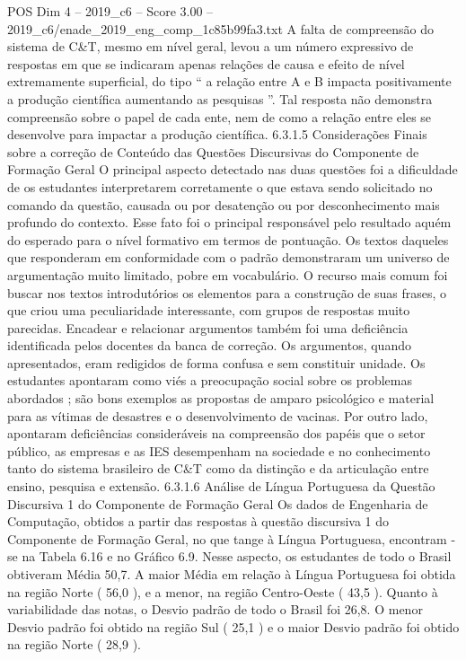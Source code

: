 \begin{textsample}{POS Dim 4 – 2019\_c6 – Score 3.00 – 2019\_c6/enade\_2019\_eng\_comp\_1c85b99fa3.txt}
A falta de compreensão do sistema de C\&T, mesmo em nível geral, levou a um número expressivo de respostas em que se indicaram apenas relações de causa e efeito de nível extremamente superficial, do tipo “ a relação entre A e B impacta positivamente a produção científica aumentando as pesquisas ”.
Tal resposta não demonstra compreensão sobre o papel de cada ente, nem de como a relação entre eles se desenvolve para impactar a produção científica. 6.3.1.5 Considerações Finais sobre a correção de Conteúdo das Questões Discursivas do Componente de Formação Geral O principal aspecto detectado nas duas questões foi a dificuldade de os estudantes interpretarem corretamente o que estava sendo solicitado no comando da questão, causada ou por desatenção ou por desconhecimento mais profundo do contexto.
Esse fato foi o principal responsável pelo resultado aquém do esperado para o nível formativo em termos de pontuação.
Os textos daqueles que responderam em conformidade com o padrão demonstraram um universo de argumentação muito limitado, pobre em vocabulário.
O recurso mais comum foi buscar nos textos introdutórios os elementos para a construção de suas frases, o que criou uma peculiaridade interessante, com grupos de respostas muito parecidas.
Encadear e relacionar argumentos também foi uma deficiência identificada pelos docentes da banca de correção.
Os argumentos, quando apresentados, eram redigidos de forma confusa e sem constituir unidade.
Os estudantes apontaram como viés a preocupação social sobre os problemas abordados ; são bons exemplos as propostas de amparo psicológico e material para as vítimas de desastres e o desenvolvimento de vacinas.
Por outro lado, apontaram deficiências consideráveis na compreensão dos papéis que o setor público, as empresas e as IES desempenham na sociedade e no conhecimento tanto do sistema brasileiro de C\&T como da distinção e da articulação entre ensino, pesquisa e extensão. 6.3.1.6 Análise de Língua Portuguesa da Questão Discursiva 1 do Componente de Formação Geral Os dados de Engenharia de Computação, obtidos a partir das respostas à questão discursiva 1 do Componente de Formação Geral, no que tange à Língua Portuguesa, encontram -se na Tabela 6.16 e no Gráfico 6.9.
Nesse aspecto, os estudantes de todo o Brasil obtiveram Média 50,7.
A maior Média em relação à Língua Portuguesa foi obtida na região Norte ( 56,0 ), e a menor, na região Centro-Oeste ( 43,5 ).
Quanto à variabilidade das notas, o Desvio padrão de todo o Brasil foi 26,8.
O menor Desvio padrão foi obtido na região Sul ( 25,1 ) e o maior Desvio padrão foi obtido na região Norte ( 28,9 ).

\end{textsample}
